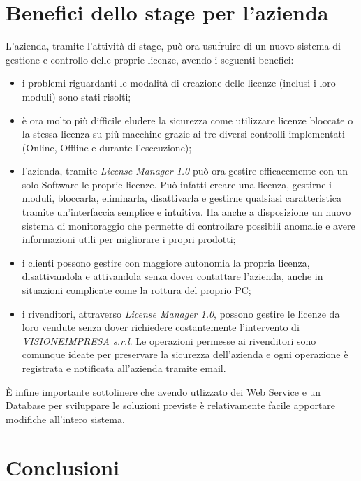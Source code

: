 \section{Benefici dello stage per l'azienda}
L'azienda, tramite l'attività di stage, può ora usufruire di un nuovo sistema di gestione e controllo delle proprie licenze, avendo i seguenti benefici:
\begin{itemize}
\item i problemi riguardanti le modalità di creazione delle licenze (inclusi i loro moduli) sono stati risolti;
\item è ora molto più difficile eludere la sicurezza come utilizzare licenze bloccate o la stessa licenza su più macchine grazie ai tre diversi controlli implementati (Online, Offline e durante l'esecuzione);
\item l'azienda, tramite \textit{License Manager 1.0} può ora gestire efficacemente con un solo Software le proprie licenze. Può infatti creare una licenza, gestirne i moduli, bloccarla, eliminarla, disattivarla e gestirne qualsiasi caratteristica tramite un'interfaccia semplice e intuitiva. Ha anche a disposizione un nuovo sistema di monitoraggio che permette di controllare possibili anomalie e avere informazioni utili per migliorare i propri prodotti;
\item i clienti possono gestire con maggiore autonomia la propria licenza, disattivandola e attivandola senza dover contattare l'azienda, anche in situazioni complicate come la rottura del proprio PC;
\item i rivenditori, attraverso \textit{License Manager 1.0}, possono gestire le licenze da loro vendute senza dover richiedere costantemente l'intervento di \textit{VISIONEIMPRESA s.r.l}. Le operazioni permesse ai rivenditori sono comunque ideate per preservare la sicurezza dell'azienda e ogni operazione è registrata e notificata all'azienda tramite email.
\end{itemize}

È infine importante sottolinere che avendo utlizzato dei Web Service e un Database per sviluppare le soluzioni previste è relativamente facile apportare modifiche all'intero sistema.

\section{Conclusioni}

